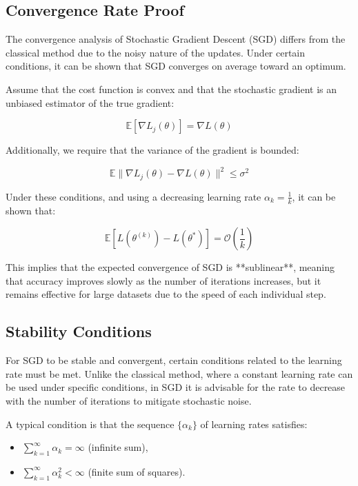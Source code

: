 \documentclass[12pt, letterpaper,conference]{IEEEtran}
\begin{document}
\vspace{0.25cm}

\subsection{Convergence Rate Proof}

The convergence analysis of Stochastic Gradient Descent (SGD) differs from the classical method due to the noisy nature of the updates. Under certain conditions, it can be shown that SGD converges on average toward an optimum.

Assume that the cost function is convex and that the stochastic gradient is an unbiased estimator of the true gradient:

\[
\mathbb{E}[\nabla L_j(\theta)] = \nabla L(\theta)
\]

Additionally, we require that the variance of the gradient is bounded:

\[
\mathbb{E}\| \nabla L_j(\theta) - \nabla L(\theta) \|^2 \leq \sigma^2
\]

Under these conditions, and using a decreasing learning rate \( \alpha_k = \frac{1}{k} \), it can be shown that:

\[
\mathbb{E}[L(\theta^{(k)}) - L(\theta^*)] = \mathcal{O}\left( \frac{1}{k} \right)
\]

This implies that the expected convergence of SGD is **sublinear**, meaning that accuracy improves slowly as the number of iterations increases, but it remains effective for large datasets due to the speed of each individual step.

\vspace{0.25cm}

\subsection{Stability Conditions}

For SGD to be stable and convergent, certain conditions related to the learning rate must be met. Unlike the classical method, where a constant learning rate can be used under specific conditions, in SGD it is advisable for the rate to decrease with the number of iterations to mitigate stochastic noise.

A typical condition is that the sequence \( \{\alpha_k\} \) of learning rates satisfies:

\begin{itemize}
    \item \( \sum_{k=1}^{\infty} \alpha_k = \infty \) (infinite sum),
    \item \( \sum_{k=1}^{\infty} \alpha_k^2 < \infty \) (finite sum of squares).
\end{itemize}
\end{document}
